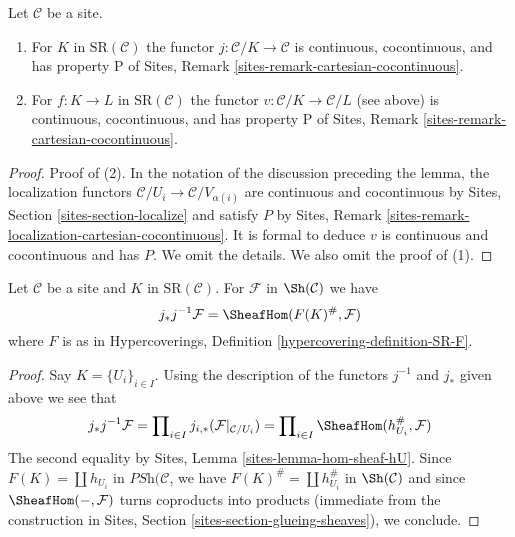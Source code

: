 \begin{lemma}
\label{lemma-has-P}
Let $\mathcal{C}$ be a site.
\begin{enumerate}
\item For $K$ in $\text{SR}(\mathcal{C})$ the functor
$j : \mathcal{C}/K \to \mathcal{C}$ is continuous,
cocontinuous, and has property P of
Sites, Remark \ref{sites-remark-cartesian-cocontinuous}.
\item For $f : K \to L$ in $\text{SR}(\mathcal{C})$
the functor $v : \mathcal{C}/K \to \mathcal{C}/L$ (see above)
is continuous, cocontinuous, and has property P of
Sites, Remark \ref{sites-remark-cartesian-cocontinuous}.
\end{enumerate}
\end{lemma}

\begin{proof}
Proof of (2). In the notation of the discussion preceding the lemma,
the localization functors $\mathcal{C}/U_i \to \mathcal{C}/V_{\alpha(i)}$
are continuous and cocontinuous by
Sites, Section \ref{sites-section-localize}
and satisfy $P$ by
Sites, Remark \ref{sites-remark-localization-cartesian-cocontinuous}.
It is formal to deduce $v$ is continuous and cocontinuous and has $P$.
We omit the details. We also omit the proof of (1).
\end{proof}

\begin{lemma}
\label{lemma-push-pull-localization}
Let $\mathcal{C}$ be a site and $K$ in $\text{SR}(\mathcal{C})$.
For $\mathcal{F}$ in $\Sh(\mathcal{C})$ we have
$$
j_*j^{-1}\mathcal{F} = \SheafHom(F(K)^\#, \mathcal{F})
$$
where $F$ is as in
Hypercoverings, Definition \ref{hypercovering-definition-SR-F}.
\end{lemma}

\begin{proof}
Say $K = \{U_i\}_{i \in I}$.
Using the description of the functors $j^{-1}$ and $j_*$
given above we see that
$$
j_*j^{-1}\mathcal{F} =
\prod\nolimits_{i \in I} j_{i, *}(\mathcal{F}|_{\mathcal{C}/U_i}) =
\prod\nolimits_{i \in I} \SheafHom(h_{U_i}^\#, \mathcal{F})
$$
The second equality by Sites, Lemma \ref{sites-lemma-hom-sheaf-hU}.
Since $F(K) = \coprod h_{U_i}$ in $\textit{PSh}(\mathcal{C}$,
we have $F(K)^\# = \coprod h_{U_i}^\#$ in $\Sh(\mathcal{C})$
and since $\SheafHom(-, \mathcal{F})$ turns coproducts into
products (immediate from the construction in
Sites, Section \ref{sites-section-glueing-sheaves}), we conclude.
\end{proof}

